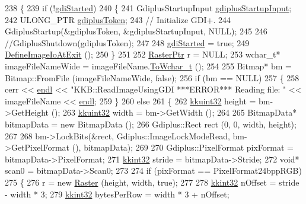 \begin{DoxyCode}
238 \{
239   \textcolor{keywordflow}{if}  (!\hyperlink{_image_i_o_8cpp_a01605ce8ea692c47a0f676af808391ba}{gdiStarted})
240   \{
241     GdiplusStartupInput \hyperlink{_image_i_o_8cpp_a3391e353e9dd078052293d5bce1f786c}{gdiplusStartupInput};
242     ULONG\_PTR           \hyperlink{_image_i_o_8cpp_a0819643ceb158cbf389a3e399351810f}{gdiplusToken};
243     \textcolor{comment}{// Initialize GDI+.}
244     GdiplusStartup(&gdiplusToken, &gdiplusStartupInput, NULL);
245 
246     \textcolor{comment}{//GdiplusShutdown(gdiplusToken);}
247 
248     \hyperlink{_image_i_o_8cpp_a01605ce8ea692c47a0f676af808391ba}{gdiStarted} = \textcolor{keyword}{true};
249     \hyperlink{namespace_k_k_b_a1691d3827f162952dbcccd55f5330f94}{DefineImageIoAtExit} ();
250   \}
251 
252   \hyperlink{class_k_k_b_1_1_raster}{RasterPtr}  r = NULL;
253   \textcolor{keywordtype}{wchar\_t}*  imageFileNameWide = imageFileName.\hyperlink{class_k_k_b_1_1_k_k_str_a91070eae51077c4745081d4face22d08}{ToWchar\_t} ();
254 
255   Bitmap*  bm = Bitmap::FromFile (imageFileNameWide, \textcolor{keyword}{false});
256   \textcolor{keywordflow}{if}  (bm == NULL)
257   \{
258     cerr << \hyperlink{namespace_k_k_b_ad1f50f65af6adc8fa9e6f62d007818a8}{endl} << \textcolor{stringliteral}{"KKB::ReadImageUsingGDI   ***ERROR***  Reading file: "} << imageFileName << 
      \hyperlink{namespace_k_k_b_ad1f50f65af6adc8fa9e6f62d007818a8}{endl};
259   \}
260   \textcolor{keywordflow}{else}
261   \{
262     \hyperlink{namespace_k_k_b_af8d832f05c54994a1cce25bd5743e19a}{kkuint32}  height = bm->GetHeight ();
263     \hyperlink{namespace_k_k_b_af8d832f05c54994a1cce25bd5743e19a}{kkuint32}  width  = bm->GetWidth ();
264 
265     BitmapData* bitmapData = \textcolor{keyword}{new} BitmapData ();
266     Gdiplus::Rect rect (0, 0, width, height);
267 
268     bm->LockBits(&rect, Gdiplus::ImageLockModeRead, bm->GetPixelFormat (), bitmapData);
269 
270     Gdiplus::PixelFormat  pixFormat = bitmapData->PixelFormat;
271     \hyperlink{namespace_k_k_b_a8fa4952cc84fda1de4bec1fbdd8d5b1b}{kkint32}  stride = bitmapData->Stride;
272     \textcolor{keywordtype}{void}*  scan0 = bitmapData->Scan0;
273 
274     \textcolor{keywordflow}{if}  (pixFormat == PixelFormat24bppRGB)
275     \{
276       r = \textcolor{keyword}{new} \hyperlink{class_k_k_b_1_1_raster}{Raster} (height, width, \textcolor{keyword}{true});
277 
278       \hyperlink{namespace_k_k_b_a8fa4952cc84fda1de4bec1fbdd8d5b1b}{kkint32}  nOffset = stride - width * 3;
279       \hyperlink{namespace_k_k_b_a8fa4952cc84fda1de4bec1fbdd8d5b1b}{kkint32}  bytesPerRow = width * 3 + nOffset;

\end{DoxyCode}
